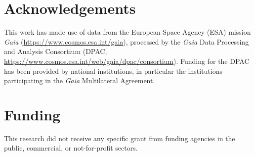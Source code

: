 \documentclass[final,5p,times,twocolumn,authoryear]{elsarticle}
\begin{document}
\section*{Acknowledgements}

This work has made use of data from the European Space Agency (ESA) mission \emph{Gaia}
(\url{https://www.cosmos.esa.int/gaia}), processed by the \emph{Gaia} Data Processing and
Analysis Consortium (DPAC, \url{https://www.cosmos.esa.int/web/gaia/dpac/consortium}).
Funding for the DPAC has been provided by national institutions, in particular the
institutions participating in the \emph{Gaia} Multilateral Agreement.

\section*{Funding}

This research did not receive any specific grant from funding agencies in the public,
commercial, or not-for-profit sectors.
\end{document}
